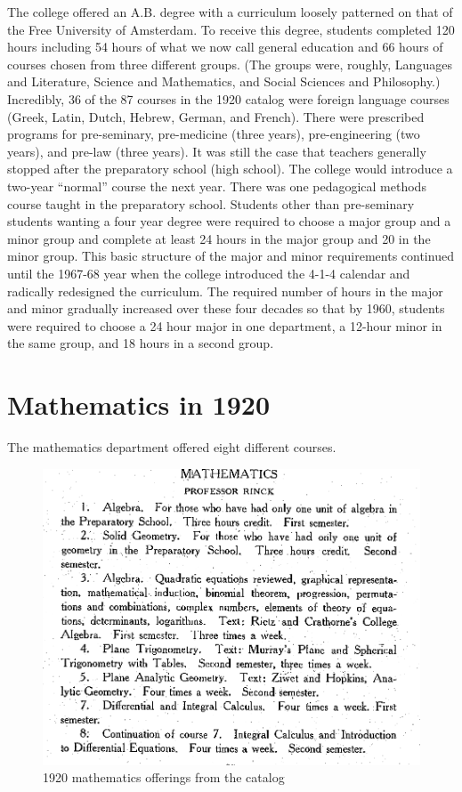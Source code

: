 \documentclass[
]{book}
\begin{document}
The college offered an A.B. degree with a curriculum loosely patterned on that of the Free University of Amsterdam. To receive this degree, students completed 120 hours including 54 hours of what we now call general education and 66 hours of courses chosen from three different groups. (The groups were, roughly, Languages and Literature, Science and Mathematics, and Social Sciences and Philosophy.) Incredibly, 36 of the 87 courses in the 1920 catalog were foreign language courses (Greek, Latin, Dutch, Hebrew, German, and French).
There were prescribed programs for pre-seminary, pre-medicine (three years), pre-engineering (two years), and pre-law (three years). It was still the case that teachers generally stopped after the preparatory school (high school). The college would introduce a two-year ``normal'' course the next year. There was one pedagogical methods course taught in the preparatory school. Students other than pre-seminary students wanting a four year degree were required to choose a major group and a minor group and complete at least 24 hours in the major group and 20 in the minor group. This basic structure of the major and minor requirements continued until the 1967-68 year when the college introduced the 4-1-4 calendar and radically redesigned the curriculum. The required number of hours in the major and minor gradually increased over these four decades so that by 1960, students were required to choose a 24 hour major in one department, a 12-hour minor in the same group, and 18 hours in a second group.

\hypertarget{mathematics-in-1920}{%
\section{Mathematics in 1920}\label{mathematics-in-1920}}

The mathematics department offered eight different courses.

\begin{figure}

{\centering \includegraphics[width=12.43in]{images/1920Program} 

}

\caption{1920 mathematics offerings from the catalog}\label{fig:1920curr}
\end{figure}
\end{document}
